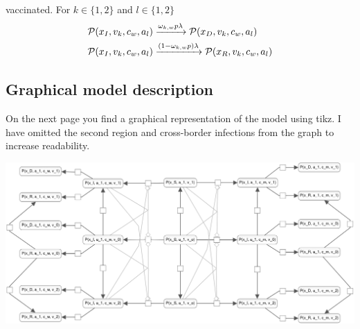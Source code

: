vaccinated. For $k \in \{1,2\}$ and $l \in \{1,2\}$
\begin{align}
    \mathcal{P}(x_I,  v_k, c_w, a_l) &\xrightarrow{\omega_{k,w} p \lambda} \mathcal{P}(x_D,  v_k, c_w, a_l) \notag \\
\mathcal{P}(x_I,  v_k, c_w, a_l) &\xrightarrow{(1-\omega_{k,w}p) \lambda} \mathcal{P}(x_R,  v_k, c_w, a_l) \notag 
\end{align}


\subsection{Graphical model description}
On the next page you find a graphical representation of the model using tikz. I have omitted the second region and cross-border infections from the graph to increase readability.  

\includegraphics[scale=0.15]{images/vaccination.png}